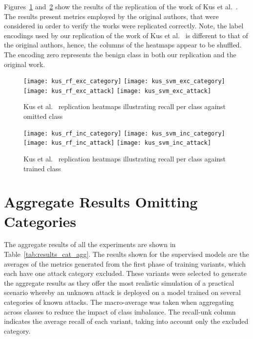 %
Figures~\ref{fig:kus_rep_exc} and~\ref{fig:kus_rep_inc} show the results of the
replication of the work of Kus et al.~\cite{Kus}. The results present metrics
employed by the original authors, that were considered in order to verify the
works were replicated correctly. Note, the label encodings used by our
replication of the work of Kus et al.~\cite{Kus} is different to that of the
original authors, hence, the columns of the heatmaps appear to be shuffled. The
encoding zero represents the benign class in both our replication and the
original work.
%
\begin{figure}[htbp]
    \centering
    \texttt{[image: kus\_rf\_exc\_category]}
    \texttt{[image: kus\_svm\_exc\_category]}
    \texttt{[image: kus\_rf\_exc\_attack]}
    \texttt{[image: kus\_svm\_exc\_attack]}
    \caption[Kus et al.~\cite{Kus} Replication Class Omission Heatmaps]{Kus et al.~\cite{Kus} replication heatmaps illustrating recall per class against omitted class\label{fig:kus_rep_exc}}
\end{figure}

\begin{figure}[htbp]
    \centering
    \texttt{[image: kus\_rf\_inc\_category]}
    \texttt{[image: kus\_svm\_inc\_category]}
    \texttt{[image: kus\_rf\_inc\_attack]}
    \texttt{[image: kus\_svm\_inc\_attack]}
    \caption[Kus et al.~\cite{Kus} Replication Single Class Heatmaps]{Kus et al.~\cite{Kus} replication heatmaps illustrating recall per class against trained class\label{fig:kus_rep_inc}}
\end{figure}
% 

\section{Aggregate Results Omitting Categories}%
\label{sec:agg_res_cat}


The aggregate results of all the experiments are shown in
Table~\ref{tab:results_cat_agg}. The results shown for the supervised models
are the averages of the metrics generated from the first phase of training
variants, which each have one attack category excluded. These variants were
selected to generate the aggregate results as they offer the most realistic
simulation of a practical scenario whereby an unknown attack is deployed on a
model trained on several categories of known attacks. The macro-average was
taken when aggregating across classes to reduce the impact of class imbalance.
The recall-unk column indicates the average recall of each variant, taking into
account only the excluded category.

